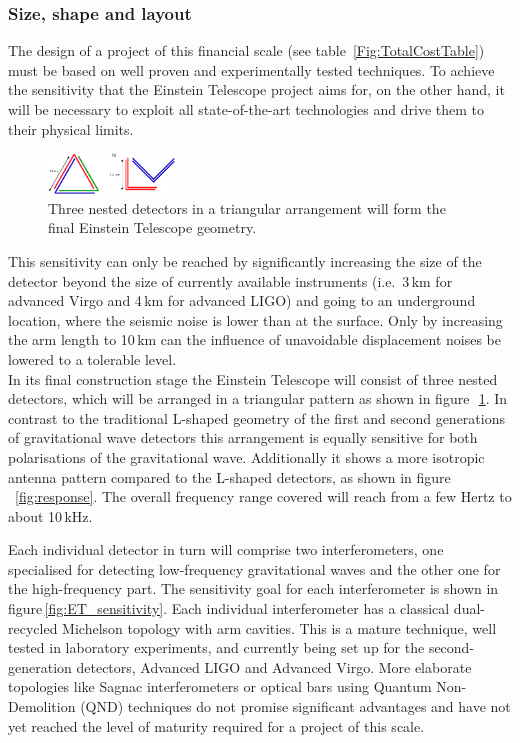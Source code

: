 \subsubsection{Size, shape and layout}
The design of a project of this financial scale (see table~\ref{Fig:TotalCostTable}) must be based on well proven and experimentally tested techniques. To achieve the sensitivity that the Einstein Telescope project aims for, on the other hand, it will be necessary to exploit all state-of-the-art technologies and drive them to their physical limits.
\begin{figure}
	\centering
		\includegraphics[width=0.3\textwidth]{Intro/Intro_Figures/NestedDetectors.pdf}
	\caption{Three nested detectors in a triangular arrangement will 
	form the final Einstein Telescope geometry.}
	\label{fig:NestedDetectors}
\end{figure}
This sensitivity can only be reached by significantly increasing the size of the 
detector beyond the size of currently available instruments (i.e.\ 3\,km for advanced Virgo 
and 4\,km for advanced LIGO) and going to an underground location, where the seismic 
noise is lower than at the surface. Only by increasing the arm length to 10\,km 
can the influence of unavoidable displacement noises be lowered to a tolerable 
level.\\
In its final construction stage the Einstein Telescope will consist of three nested
detectors, which will be arranged in a triangular pattern as shown in 
figure\,~\ref{fig:NestedDetectors}. 
In contrast to the traditional L-shaped geometry of the first and second generations 
of gravitational wave detectors this arrangement is equally sensitive for both 
polarisations of the gravitational wave. Additionally it shows a more isotropic 
antenna pattern compared to the L-shaped detectors, as shown in 
figure\,~\ref{fig:response}. The overall frequency range covered will reach from 
a few Hertz to about 10\,kHz.

Each individual detector in turn will comprise two interferometers, one 
specialised for detecting low-frequency gravitational waves and the other one 
for the high-frequency part. The sensitivity goal for each interferometer is shown 
in figure\,\ref{fig:ET_sensitivity}. %
Each individual interferometer has a classical dual-recycled Michelson topology 
with arm cavities. This is a mature technique, well tested in laboratory 
experiments, and currently being set up for the second-generation detectors, 
Advanced LIGO and Advanced Virgo. More elaborate topologies like Sagnac 
interferometers or optical bars using Quantum Non-Demolition (QND) techniques 
do not promise significant advantages and have not yet reached the level of 
maturity required for a project of this scale.\\

